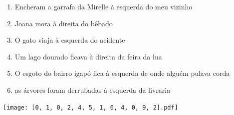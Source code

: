 \documentclass[12pt]{article}
\begin{document}
		 

\pagebreak


	\begin{enumerate}
		  \sffamily %
		  \large %


\vfill \item
Encheram a garrafa da Mirelle	%
à esquerda
do meu vizinho	%

\vfill \item
Joana mora	%
à direita
do bêbado	%

\vfill \item
O gato viaja	%
à esquerda
do acidente	%

\vfill \item
Um lago dourado ficava	%
à direita
da feira da lua	%

\vfill \item
O esgoto do bairro igapó fica	%
à esquerda
de onde alguém pulava corda	%

\vfill \item
as árvores foram derrubadas	%
à esquerda
da livraria	%
	\end{enumerate}
		  
		  \hfill

		  \vfill

\texttt{[image: [0, 1, 0, 2, 4, 5, 1, 6, 4, 0, 9, 2].pdf]}


	\hfill	  	  


\pagebreak			
\end{document}
